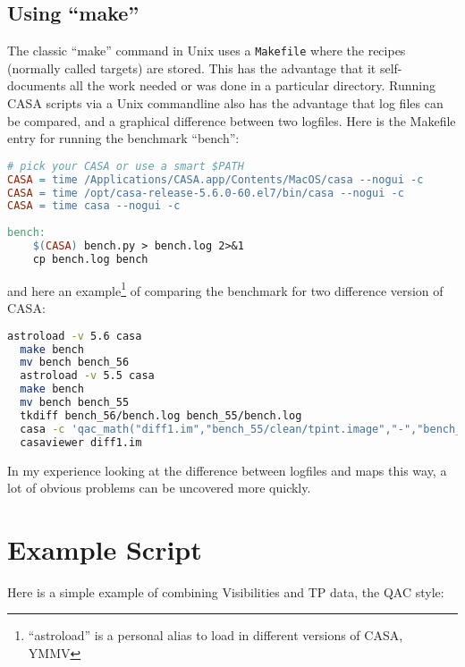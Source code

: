 \documentclass[12pt,a4paper]{article}
\begin{document}
\begin{lstlisting}[language=bash]
  % casa --nogui -c foo.py pdir='"test1"' imsize=1024 pixel=0.1 niter='[0,1000]'  > test1.log 2>&1
\end{lstlisting}

\subsection{Using ``make''}

The classic ``make'' command in Unix uses a \verb+Makefile+ where the recipes (normally called targets) are stored. This has the advantage that
it self-documents all the work needed or was done in a particular directory. Running CASA scripts via a Unix commandline also has the
advantage that log files can be compared, and a  graphical difference between two logfiles.
Here is the Makefile entry for running the benchmark ``bench'':

\begin{lstlisting}[language=make]
  # pick your CASA or use a smart $PATH
CASA = time /Applications/CASA.app/Contents/MacOS/casa --nogui -c
CASA = time /opt/casa-release-5.6.0-60.el7/bin/casa --nogui -c
CASA = time casa --nogui -c
  
bench:
    $(CASA) bench.py > bench.log 2>&1
    cp bench.log bench
\end{lstlisting}

and here an example\footnote{``astroload'' is a personal alias to load in different versions of CASA, YMMV} of comparing the
benchmark for two difference version of CASA:

\begin{lstlisting}[language=bash]
  astroload -v 5.6 casa
  make bench
  mv bench bench_56
  astroload -v 5.5 casa
  make bench
  mv bench bench_55
  tkdiff bench_56/bench.log bench_55/bench.log
  casa -c 'qac_math("diff1.im","bench_55/clean/tpint.image","-","bench_56/clean/tpint.image")'
  casaviewer diff1.im
\end{lstlisting}

In my experience looking at the difference between logfiles and maps this way, a lot of obvious problems can be uncovered more quickly.

\section{Example Script}

Here is a simple example of combining Visibilities and TP data, the QAC style:
\end{document}
